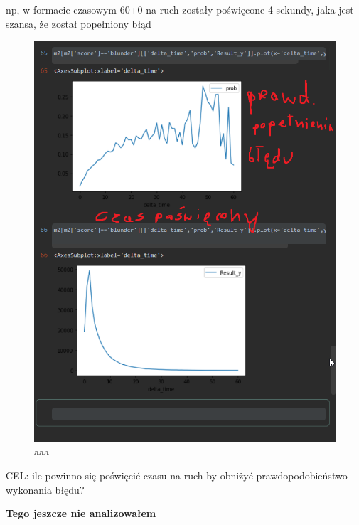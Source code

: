 \documentclass[inzynierska]{pwr_wmat_praca_dyplomowa}
\theoremstyle{plain}
\numberwithin{theorem}{chapter}
\theoremstyle{definition}
\numberwithin{theorem}{chapter}
\begin{document}
np, w formacie czasowym 60+0 na ruch zostały poświęcone 4 sekundy, jaka jest szansa, że został popełniony błąd \newline
\begin{figure}[H]
	\centering
	\includegraphics[width=\textwidth]{p_od_czasu.png}
	\caption{aaa}\label{aaa}
\end{figure}
CEL: 
ile powinno się poświęcić czasu na ruch by obniżyć prawdopodobieństwo wykonania błędu?\newline

\textbf{Tego jeszcze nie analizowałem}
\end{document}
